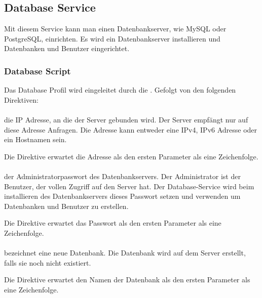 \subsection{Database Service}

Mit diesem Service kann man einen Datenbankserver, wie MySQL oder PostgreSQL,
einrichten. Es wird ein Datenbankserver installieren und Datenbanken
und Benutzer eingerichtet.

\subsubsection{Database Script}

Das Database Profil wird eingeleitet durch die . Gefolgt von
den folgenden Direktiven:

\paragraph{}

die IP Adresse, an die der Server gebunden wird. Der Server empfängt nur auf diese
Adresse Anfragen. Die Adresse kann entweder eine IPv4, IPv6 Adresse oder
ein Hostnamen sein.

Die Direktive erwartet die Adresse als den ersten Parameter als eine Zeichenfolge.

\paragraph{}

der Administratorpasswort des Datenbankservers. Der Administrator ist der Benutzer,
der vollen Zugriff auf den Server hat. Der Database-Service wird beim installieren
des Datenbankservers dieses Passwort setzen und verwenden um Datenbanken und Benutzer
zu erstellen.

Die Direktive erwartet das Passwort als den ersten Parameter als eine Zeichenfolge.

\paragraph{}

bezeichnet eine neue Datenbank. Die Datenbank wird auf dem Server erstellt, falls
sie noch nicht existiert.

Die Direktive erwartet den Namen der Datenbank als den ersten Parameter als eine Zeichenfolge.

